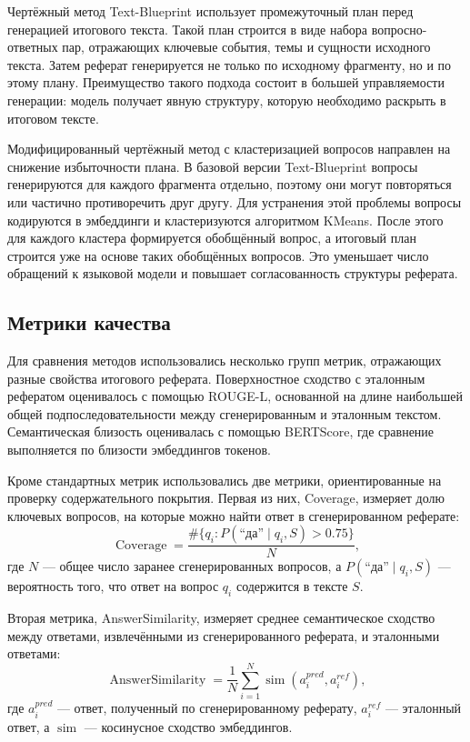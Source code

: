 \documentclass[oneside,senior,etd]{BYUPhys}
\begin{document}
Чертёжный метод Text-Blueprint использует промежуточный план перед генерацией итогового текста. 
Такой план строится в виде набора вопросно-ответных пар, отражающих ключевые события, темы и сущности исходного текста. 
Затем реферат генерируется не только по исходному фрагменту, но и по этому плану. 
Преимущество такого подхода состоит в большей управляемости генерации: модель получает явную структуру, 
которую необходимо раскрыть в итоговом тексте.

Модифицированный чертёжный метод с кластеризацией вопросов направлен на снижение избыточности плана. 
В базовой версии Text-Blueprint вопросы генерируются для каждого фрагмента отдельно, поэтому они могут повторяться или частично противоречить друг другу. 
Для устранения этой проблемы вопросы кодируются в эмбеддинги и кластеризуются алгоритмом KMeans. 
После этого для каждого кластера формируется обобщённый вопрос, а итоговый план строится уже на основе таких обобщённых вопросов. 
Это уменьшает число обращений к языковой модели и повышает согласованность структуры реферата.

\subsection{Метрики качества}

Для сравнения методов использовались несколько групп метрик, отражающих разные свойства итогового реферата. 
Поверхностное сходство с эталонным рефератом оценивалось с помощью ROUGE-L, 
основанной на длине наибольшей общей подпоследовательности между сгенерированным и эталонным текстом. 
Семантическая близость оценивалась с помощью BERTScore, где сравнение выполняется по близости эмбеддингов токенов.

Кроме стандартных метрик использовались две метрики, ориентированные на проверку содержательного покрытия. 
Первая из них, Coverage, измеряет долю ключевых вопросов, на которые можно найти ответ в сгенерированном реферате:
\[
\operatorname{Coverage} = \frac{\#\{q_i : P(\text{``да''} \mid q_i, S) > 0.75\}}{N},
\]
где $N$ --- общее число заранее сгенерированных вопросов, а $P(\text{``да''} \mid q_i, S)$ --- вероятность того, что ответ на вопрос $q_i$ содержится в тексте $S$.

Вторая метрика, AnswerSimilarity, измеряет среднее семантическое сходство между ответами, извлечёнными из сгенерированного реферата, и эталонными ответами:
\[
\operatorname{AnswerSimilarity} = \frac{1}{N}\sum_{i=1}^{N}\operatorname{sim}(a_i^{pred}, a_i^{ref}),
\]
где $a_i^{pred}$ --- ответ, полученный по сгенерированному реферату, $a_i^{ref}$ --- эталонный ответ, а $\operatorname{sim}$ --- косинусное сходство эмбеддингов.
\end{document}
